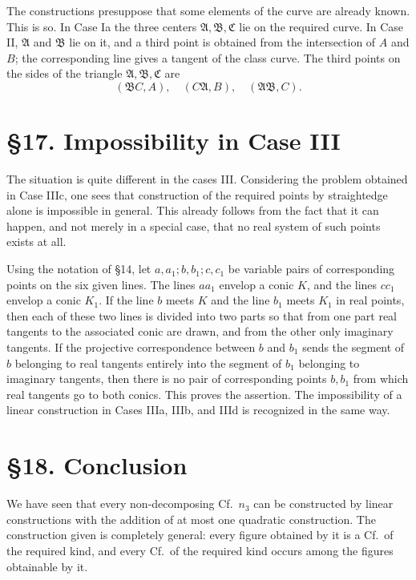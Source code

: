 \documentclass[11pt]{article}
\newcommand{\Cf}{\textup{Cf.}}
\begin{document}
The constructions presuppose that some elements of the curve are already known. This is so. In Case Ia the three centers $\mathfrak A,\mathfrak B,\mathfrak C$ lie on the required curve. In Case II, $\mathfrak A$ and $\mathfrak B$ lie on it, and a third point is obtained from the intersection of $A$ and $B$; the corresponding line gives a tangent of the class curve. The third points on the sides of the triangle $\mathfrak A,\mathfrak B,\mathfrak C$ are
\[
(\mathfrak B C,A),
\quad(C\mathfrak A,B),
\quad(\mathfrak A\mathfrak B,C).
\]

\section*{\S 17. Impossibility in Case III}
The situation is quite different in the cases III. Considering the problem obtained in Case IIIc, one sees that construction of the required points by straightedge alone is impossible in general. This already follows from the fact that it can happen, and not merely in a special case, that no real system of such points exists at all.

Using the notation of \S 14, let $a,a_1;b,b_1;c,c_1$ be variable pairs of corresponding points on the six given lines. The lines $aa_1$ envelop a conic $K$, and the lines $cc_1$ envelop a conic $K_1$. If the line $b$ meets $K$ and the line $b_1$ meets $K_1$ in real points, then each of these two lines is divided into two parts so that from one part real tangents to the associated conic are drawn, and from the other only imaginary tangents. If the projective correspondence between $b$ and $b_1$ sends the segment of $b$ belonging to real tangents entirely into the segment of $b_1$ belonging to imaginary tangents, then there is no pair of corresponding points $b,b_1$ from which real tangents go to both conics. This proves the assertion. The impossibility of a linear construction in Cases IIIa, IIIb, and IIId is recognized in the same way.

\section*{\S 18. Conclusion}
We have seen that every non-decomposing \Cf\ $n_3$ can be constructed by linear constructions with the addition of at most one quadratic construction. The construction given is completely general: every figure obtained by it is a \Cf\ of the required kind, and every \Cf\ of the required kind occurs among the figures obtainable by it.
\end{document}
